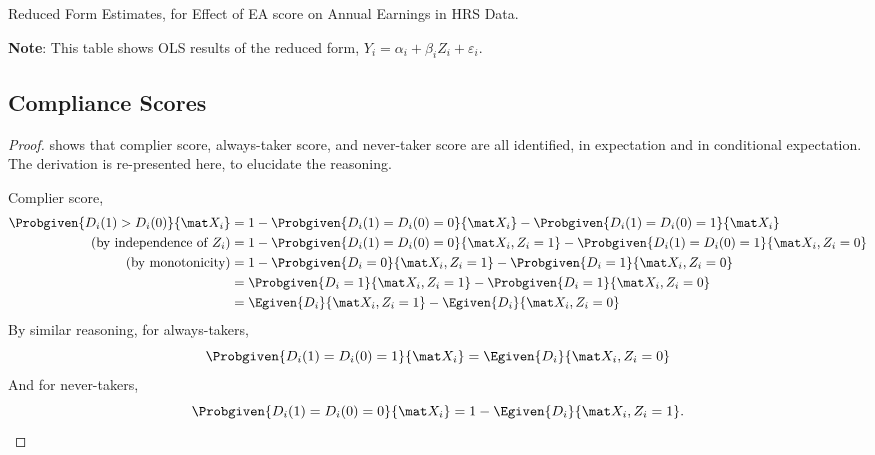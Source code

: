 \begin{table}[H]
    \singlespacing
    \small
    \centering
    \caption{Reduced Form Estimates, for Effect of EA score on Annual Earnings in HRS Data.}
    \makebox[\textwidth][c]{}
    \label{tab:reducedform-reg}
    \justify
    \footnotesize
    \textbf{Note}:
    This table shows OLS results of the reduced form, $Y_i = \alpha_i + \beta_i Z_i + \varepsilon_i$.
\end{table}

\subsection{Compliance Scores}
\begin{proof}
    \label{proof:complierscore}
    \citet[Lemma~3.1]{abadie2003semiparametric} shows that complier score, always-taker score, and never-taker score are all identified, in expectation and in conditional expectation.
    The derivation is re-presented here, to elucidate the reasoning.

    Complier score,
    \begin{align*}
        \Probgiven{D_i(1) > D_i(0)}{\mat X_i}
            &= 1 - \Probgiven{D_i(1) = D_i(0) = 0}{\mat X_i} - \Probgiven{D_i(1) = D_i(0) = 1}{\mat X_i} \\
            \text{(by independence of $Z_i$)} &=
                1 - \Probgiven{D_i(1) = D_i(0) = 0}{\mat X_i, Z_i = 1} - \Probgiven{D_i(1) = D_i(0) = 1}{\mat X_i, Z_i = 0} \\
            \text{(by monotonicity)} &=
                1 - \Probgiven{D_i = 0}{\mat X_i, Z_i = 1} - \Probgiven{D_i = 1}{\mat X_i, Z_i = 0} \\
            &= \Probgiven{D_i = 1}{\mat X_i, Z_i = 1} - \Probgiven{D_i = 1}{\mat X_i, Z_i = 0} \\
            &= \Egiven{D_i}{\mat X_i, Z_i = 1} - \Egiven{D_i}{\mat X_i, Z_i = 0} \\
    \end{align*}
    By similar reasoning, for always-takers,
    \[ \Probgiven{D_i(1) = D_i(0) = 1}{\mat X_i} = \Egiven{D_i}{\mat X_i, Z_i = 0} \]
    And for never-takers,
    \[ \Probgiven{D_i(1) = D_i(0) = 0}{\mat X_i} = 1 - \Egiven{D_i}{\mat X_i, Z_i = 1}. \]
\end{proof}

